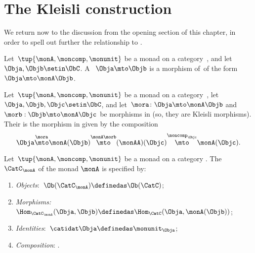 
\section{The Kleisli construction}
\label{sec:Kleisli}

We return now to the discussion from the opening section of this chapter, in order to spell out further the relationship to .

\begin{ctdefinition}
    \label{def:kleisli-morphism}
    Let~$\tup{\monA, \moncomp, \monunit}$ be a monad on a category~\CatC, and let~$\Obja, \Objb \setin \ObC$.
    A ~$\Obja \mto \Objb$ is a morphism of~\CatC of the form~$\Obja \mto \monA \Objb$.
\end{ctdefinition}

\begin{ctdefinition}
    \label{def:kleisli-composition}
    Let~$\tup{\monA, \moncomp, \monunit}$ be a monad on a category~\CatC, let~$\Obja, \Objb, \Objc \setin \ObC$,  and let~$\mora \colon \Obja \mto \monA \Objb$ and $\morb : \Objb \mto \monA \Objc$ be morphisms in \CatC (so, they are Kleisli morphisms).
    Their  is the morphism in \CatC given by the composition
    \begin{equation}
        \Obja \overset{\mora}{\mto} \monA(\Objb) \overset{\monA \morb}{\mto} (\monAA)(\Objc) \overset{\moncomp_\Objc}{\mto} \monA(\Objc).
    \end{equation}
\end{ctdefinition}

\begin{ctdefinition}
    \label{def:kleisli-category}
    Let~$\tup{\monA, \moncomp, \monunit}$ be a monad on a category \CatC.
    The  $\CatC_\monA$ of the monad $\monA$ is specified by:
    \begin{enumerate}
        \item \emph{Objects}:~$\Ob(\CatC_\monA) \definedas \Ob(\CatC)$;
        \item \emph{Morphisms:}~$\Hom_{\CatC_\monA}(\Obja, \Objb) \definedas \Hom_{\CatC}(\Obja, \monA(\Objb))$;
        \item \emph{Identities}:~$\catidat\Obja \definedas \monunit_\Obja$;
        \item \emph{Composition}: .
    \end{enumerate}
\end{ctdefinition}

